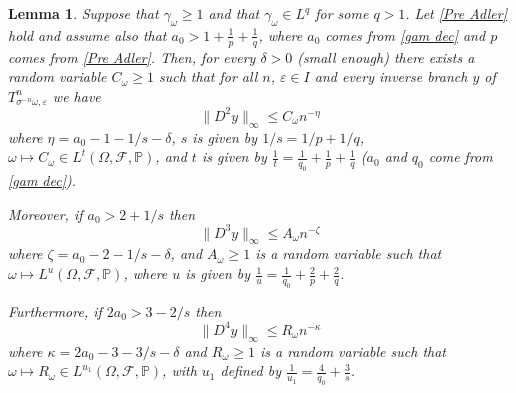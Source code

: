 \documentclass[11pt,reqno,a4paper]{article}
\newtheorem{lemma}[theorem]{Lemma}
\theoremstyle{special}
\def\om{\omega}
\begin{document}
\begin{lemma}\label{Lemma 4}
Suppose that $\gamma_\omega\geq1$ and that $\gamma_\omega\in L^q$ for some $q>1$. Let   \eqref{Pre Adler} hold and
assume also that $a_0>1+\frac{1}{p}+\frac1{q}$, where $a_0$ comes from \eqref{gam dec} and $p$ comes from \eqref{Pre Adler}.
Then, for every $\delta>0$ (small enough) there exists a random variable $C_\omega\geq 1$ such that
for all $n$, $\varepsilon\in I$ and every inverse branch $y$ of $T_{\sigma^{-n}\omega,\varepsilon}^n$ we have 
\begin{equation}\label{11}
\|D^2y\|_\infty\leq C_\omega n^{-\eta}    
\end{equation}
where $\eta=a_0-1-1/s-\delta$,
$s$ is given by $1/s=1/p+1/q$,  $\omega\mapsto C_\omega\in L^{t}(\Omega,\mathcal F,\mathbb P)$, and $t$ is given by $\frac{1}{t}=\frac{1}{q_0}+\frac{1}{p}+\frac{1}{q}$ ($a_0$ and $q_0$ come from \eqref{gam dec}). 

Moreover, if $a_0>2+1/s$ then
\begin{equation}\label{12}
\|D^3y\|_\infty\leq A_\om n^{-\zeta}    
\end{equation}
where $\zeta=a_0-2-1/s-\delta$, 
and $A_\om\geq 1$ is a random variable such that $\om\mapsto L^u(\Omega, \mathcal F,\mathbb P)$, where $u$ is given by $\frac{1}u=\frac{1}{q_0}+\frac{2}{p}+\frac{2}{q}$.

Furthermore, if $2a_0>3-2/s$ then
\begin{equation}\label{13}
\|D^4y\|_{\infty}\leq R_\om n^{-\kappa}
\end{equation}
where $\kappa=2a_0-3-3/s-\delta$ and  $R_\om\geq1$ is 
a random variable
such that $\omega\mapsto R_\om\in L^{u_1}(\Omega,\mathcal F,\mathbb P)$, with $u_1$  defined by $\frac1{u_1}=\frac{4}{q_0}+\frac{3}{s}$. 
\end{lemma}
\end{document}

